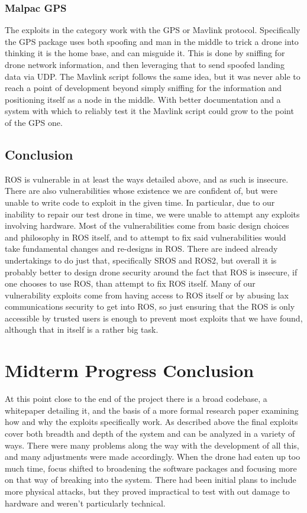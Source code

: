 \documentclass[IEEEtran,letterpaper,10pt,notitlepage,draftclsnofoot,onecolumn]{article}
\begin{document}
\subsubsection{Malpac GPS}
The exploits in the category work with the GPS or Mavlink protocol.
Specifically the GPS package uses both spoofing and man in the middle to trick a drone into thinking it is the home base, and can misguide it.
This is done by sniffing for drone network information, and then leveraging that to send spoofed landing data via UDP.
The Mavlink script follows the same idea, but it was never able to reach a point of development beyond simply sniffing for the information and positioning itself as a node in the middle.
With better documentation and a system with which to reliably test it the Mavlink script could grow to the point of the GPS one.

\subsection{Conclusion}
ROS is vulnerable in at least the ways detailed above, and as such is insecure. 
There are also vulnerabilities whose existence we are confident of, but were unable to write code to exploit in the given time. 
In particular, due to our inability to repair our test drone in time, we were unable to attempt any exploits involving hardware. 
Most of the vulnerabilities come from basic design choices and philosophy in ROS itself, and to attempt to fix said vulnerabilities would take fundamental changes and re-designs in ROS. 
There are indeed already undertakings to do just that, specifically SROS and ROS2, but overall it is probably better to design drone security around the fact that ROS is insecure, if one chooses to use ROS, than attempt to fix ROS itself. 
Many of our vulnerability exploits come from having access to ROS itself or by abusing lax communications security to get into ROS, so just ensuring that the ROS is only accessible by trusted users is enough to prevent most exploits that we have found, although that in itself is a rather big task.

\section{Midterm Progress Conclusion}
At this point close to the end of the project there is a broad codebase, a whitepaper detailing it, and the basis of a more formal research paper examining how and why the exploits specifically work.
As described above the final exploits cover both breadth and depth of the system and can be analyzed in a variety of ways.
There were many problems along the way with the development of all this, and many adjustments were made accordingly.
When the drone had eaten up too much time, focus shifted to broadening the software packages and focusing more on that way of breaking into the system.
There had been initial plans to include more physical attacks, but they proved impractical to test with out damage to hardware and weren't particularly technical.
\end{document}
